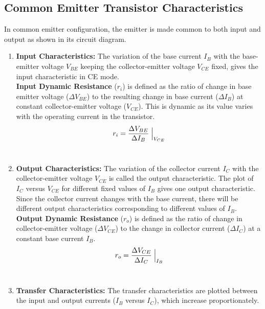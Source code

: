 \subsection{Common Emitter Transistor Characteristics}

In common emitter configuration, the emitter is made common to both input and output as shown in its circuit diagram.\\

\begin{enumerate}

\item \textbf{Input Characteristics:}
    The variation of the base current $I_B$ with the base-emitter voltage $V_{BE}$ keeping the collector-emitter voltage $V_{CE}$ fixed, gives the input characteristic in CE mode.\\

    \textbf{Input Dynamic Resistance} ($r_i$) is defined as the ratio of change in base emitter voltage ($\Delta V_{BE}$) to the resulting change in base current ($\Delta I_B$) at constant collector-emitter voltage ($V_{CE}$). This is dynamic as its value varies with the operating current in the transistor.
    \begin{align}
        r_i = \frac{\Delta V_{BE}}{\Delta I_B}\Bigm|_{V_{CE}}
    \end{align}\\

\item \textbf{Output Characteristics:}
    The variation of the collector current $I_C$ with the collector-emitter voltage $V_{CE}$ is called the output characteristic. The plot of $I_C$ versus $V_{CE}$ for different fixed values of $I_B$ gives one output characteristic. Since the collector current changes with the base current, there will be different output characteristics corresponding to different values of $I_B$.\\

    \textbf{Output Dynamic Resistance} ($r_o$) is defined as the ratio of change in collector-emitter voltage ($\Delta V_{CE}$) to the change in collector current ($\Delta I_C$) at a constant base current $I_B$.
    \begin{align}
        r_o = \frac{\Delta V_{CE}}{\Delta I_C}\Bigm|_{I_B}
    \end{align}\\

\item \textbf{Transfer Characteristics:} 
    The transfer characteristics are plotted between the input and output currents ($I_B$ versus $I_C$), which increase proportionately.\\


\end{enumerate}
